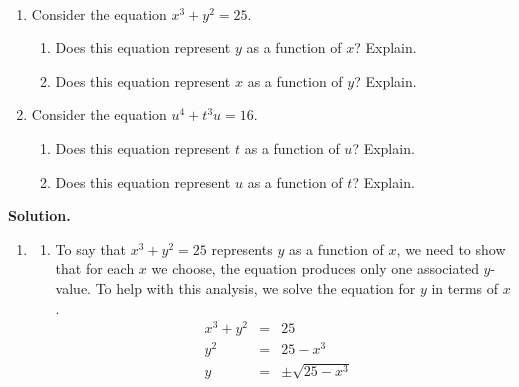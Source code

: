 \documentclass{ximera}
\begin{document}
\begin{example} \label{equationfunction}   $~$

\begin{enumerate}

\item  Consider the equation $x^{3} + y^{2} = 25$.

\begin{enumerate}

\item Does this equation represent $y$ as a function of $x$?  Explain.

\item Does this equation represent $x$ as a function of $y$?  Explain.

\end{enumerate}

\item Consider the equation $u^{4} + t^{3}u = 16$.  

\begin{enumerate}

\item Does this equation represent $t$ as a function of $u$?  Explain.

\item Does this equation represent $u$ as a function of $t$?  Explain.

\end{enumerate}

\end{enumerate}

{\bf Solution.}

\begin{enumerate}

\item 

\begin{enumerate}

\item  To say that $x^{3} + y^{2} = 25$ represents $y$ as a function of $x$, we need to show that for each $x$ we choose, the equation produces only one associated $y$-value. To help with this analysis, we solve the equation for $y$ in terms of $x$. \[ \begin{array}{rclr}

x^{3} + y^{2}  & = &  25 & \\

y^{2} & = & 25 - x^{3} & \\

y & = & \pm \sqrt{25 - x^{3}} \\


\end{array}\]
\end{enumerate}
\end{enumerate}
\end{example}
\end{document}
